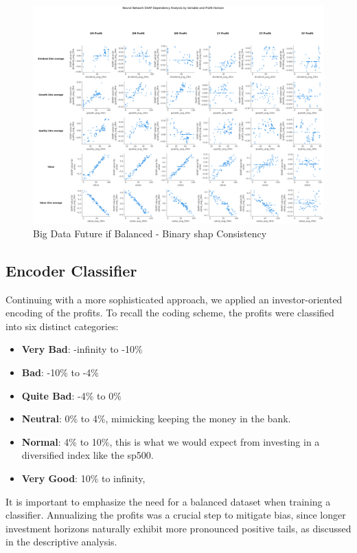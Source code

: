\documentclass[11pt,english,a4paper,hidelinks]{book}
\begin{document}
\begin{figure}[H]
    \centering
    \includegraphics[width=1\textwidth]{images/code/models/neural_network/binary_classifier_nn/Big Data future - IF HARD Balanced/shap_table_analysis.png}
    \caption{Big Data Future \acrshort{if} Balanced - Binary \gls{shap} Consistency}
    \label{fig:big_binary_shap_consistency}
\end{figure}


\subsection{Encoder Classifier}

Continuing with a more sophisticated approach, we applied an investor-oriented encoding of the profits. To recall the coding scheme, the profits were classified into six distinct categories:
\begin{itemize}
    \item \textbf{Very Bad}: -infinity to -10\%
    \item \textbf{Bad}: -10\% to -4\%
    \item \textbf{Quite Bad}: -4\% to 0\%
    \item \textbf{Neutral}: 0\% to 4\%, mimicking keeping the money in the bank.
    \item \textbf{Normal}: 4\% to 10\%, this is what we would expect from investing in a diversified index like the \acrshort{sp500}.
    \item \textbf{Very Good}: 10\% to infinity, 
\end{itemize}

\noindent It is important to emphasize the need for a balanced dataset when training a classifier. Annualizing the profits was a crucial step to mitigate bias, since longer investment horizons naturally exhibit more pronounced positive tails, as discussed in the descriptive analysis.
\end{document}
